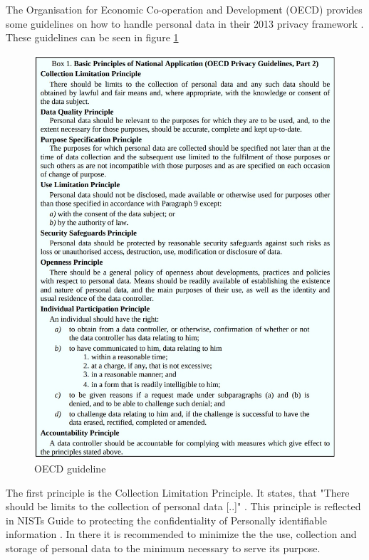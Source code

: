         The Organisation for Economic Co-operation and Development (OECD) provides some guidelines on how to handle personal data in their 2013 privacy framework \cite{oecd_oecd_2013}. These guidelines can be seen in figure \ref{fig:oecd_guide} 
        \begin{figure}
            \centering
            \includegraphics[width=\textwidth]{latex/figures/oecd_guidelines.jpg}
            \caption[OECD guideline]{OECD guideline \cite{oecd_oecd_2013}}
            \label{fig:oecd_guide}
        \end{figure}
        The first principle is the Collection Limitation Principle. It states, that "There should be limits to the collection of personal data [..]" \cite{oecd_oecd_2013}. This principle is reflected in NISTs Guide to protecting the confidentiality of Personally identifiable information \cite{mccallister_guide_2010}. In there it is recommended to minimize the the use, collection and storage of personal data to the minimum necessary to serve its purpose.
